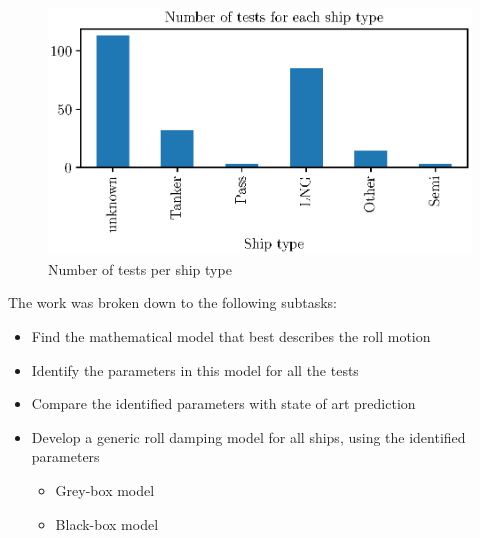 \begin{figure}[!htb]
    \centering
    \includegraphics[width=0.5\columnwidth]{kappa/images/ship_types.eps}
    \caption{Number of tests per ship type}
    \label{fig:ship_types}
\end{figure}

\noindent The work was broken down to the following subtasks: 
\begin{itemize}
    \item Find the mathematical model that best describes the roll motion
    \item Identify the parameters in this model for all the tests
    \item Compare the identified parameters with state of art prediction
    \item Develop a generic roll damping model for all ships, using the identified parameters
    \begin{itemize}
        \item Grey-box model
        \item Black-box model
    \end{itemize}
\end{itemize}

